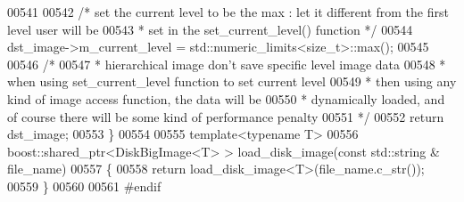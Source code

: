 \begin{DoxyCode}
00541 
00542         \textcolor{comment}{/* set the current level to be the max : let it different from the
       first level user will be }
00543 \textcolor{comment}{         * set in the set\_current\_level() function */}
00544         dst\_image->m\_current\_level = std::numeric\_limits<size\_t>::max();
00545 
00546         \textcolor{comment}{/*}
00547 \textcolor{comment}{         * hierarchical image don't save specific level image data}
00548 \textcolor{comment}{         * when using set\_current\_level function to set current level}
00549 \textcolor{comment}{         * then using any kind of image access function, the data will be}
00550 \textcolor{comment}{         * dynamically loaded, and of course there will be some kind of
       performance penalty}
00551 \textcolor{comment}{         */}
00552         \textcolor{keywordflow}{return} dst\_image;
00553 \}
00554 
00555 \textcolor{keyword}{template}<\textcolor{keyword}{typename} T>
00556 boost::shared\_ptr<DiskBigImage<T> > load\_disk\_image(\textcolor{keyword}{const} std::string &
      file\_name)
00557 \{
00558         \textcolor{keywordflow}{return} load\_disk\_image<T>(file\_name.c\_str());
00559 \}
00560 
00561 \textcolor{preprocessor}{#endif}
\end{DoxyCode}
